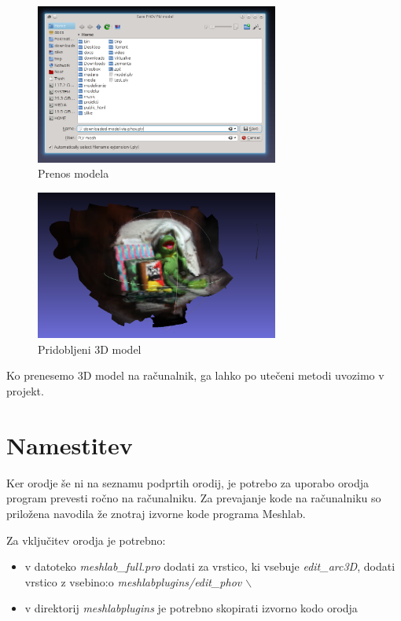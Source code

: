 \documentclass[11pt]{article}
\begin{document}
\begin{figure}[!htbp]
\centering
\includegraphics[width=8cm]{./download.png}
\caption{\label{fig:download}Prenos modela}
\end{figure}

\begin{figure}[!htbp]
\centering
\includegraphics[width=8cm]{./model.png}
\caption{\label{fig:model}Pridobljeni 3D model}
\end{figure}

Ko prenesemo 3D model na računalnik, ga lahko po utečeni metodi
uvozimo v projekt.

\section{Namestitev}
\label{sec-3}
Ker orodje še ni na seznamu podprtih orodij, je potrebo za uporabo
orodja program prevesti ročno na računalniku. Za prevajanje kode na
računalniku so priložena navodila že znotraj izvorne kode programa
Meshlab. 

Za vključitev orodja je potrebno:
\begin{itemize}
\item v datoteko \emph{meshlab\_full.pro} dodati za vrstico, ki vsebuje \emph{edit\_arc3D}, dodati vrstico z vsebino:o \emph{meshlabplugins/edit\_phov $\backslash$}
\item v direktorij \emph{meshlabplugins} je potrebno skopirati izvorno kodo orodja
\end{itemize}
\end{document}
